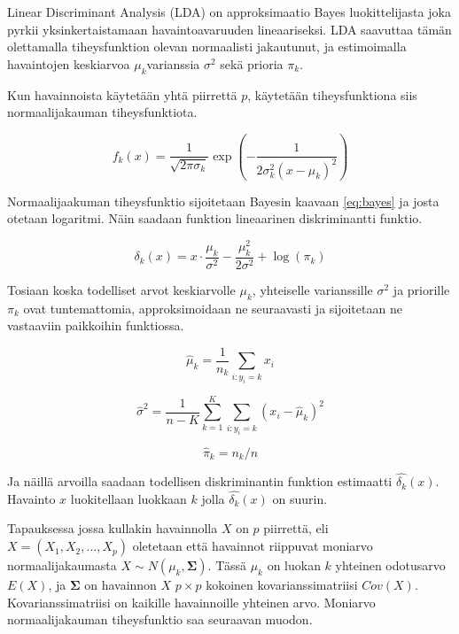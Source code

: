 \documentclass[finnish,twoside,openright]{HYgraduMLDS}
\begin{document}
Linear Discriminant Analysis (LDA) on approksimaatio Bayes luokittelijasta joka pyrkii yksinkertaistamaan havaintoavaruuden lineaariseksi. LDA saavuttaa tämän olettamalla tiheysfunktion olevan normaalisti jakautunut, ja estimoimalla havaintojen keskiarvoa $\mu_k$varianssia $\sigma^2$ sekä prioria $\pi_k$.

Kun havainnoista käytetään yhtä piirrettä $p$, käytetään tiheysfunktiona siis normaalijakauman tiheysfunktiota.

\begin{equation}
    f_k(x) = \frac{1}{\sqrt{2 \pi \sigma_k}} \exp{(-\frac{1}{2 \sigma^2_k (x - \mu_k)^2})}
\end{equation}

Normaalijaakuman tiheysfunktio sijoitetaan Bayesin kaavaan \ref{eq:bayes} ja josta otetaan logaritmi. Näin saadaan funktion lineaarinen diskriminantti funktio.

\begin{equation}
    \delta_k(x) = x \cdot \frac{\mu_k}{\sigma^2} - \frac{\mu^2_k}{2 \sigma^2} + \log(\pi_k)
\end{equation}

Tosiaan koska todelliset arvot keskiarvolle $\mu_k$, yhteiselle varianssille $\sigma^2$ ja priorille $\pi_k$ ovat tuntemattomia, approksimoidaan ne seuraavasti ja sijoitetaan ne vastaaviin paikkoihin funktiossa.

\begin{equation} \label{eq:estimate-mu}
    \hat{\mu}_k = \frac{1}{n_k} \sum_{i:y_i = k} x_i
\end{equation}

\begin{equation}
    \hat{\sigma}^2 = \frac{1}{n - K} \sum^K_{k=1} \sum_{i:y_i = k} (x_i - \hat{\mu}_k)^2
\end{equation}

\begin{equation} \label{eq:estimate-pi}
    \hat{\pi}_k = n_k / n
\end{equation}

Ja näillä arvoilla saadaan todellisen diskriminantin funktion estimaatti $\hat{\delta_k}(x)$. Havainto $x$ luokitellaan luokkaan $k$ jolla $\hat{\delta_k}(x)$ on suurin.

Tapauksessa jossa kullakin havainnolla $X$ on $p$ piirrettä, eli $X = (X_1, X_2, \dots, X_p)$ oletetaan että havainnot riippuvat moniarvo normaalijakaumasta $X \sim N(\mu_k, \pmb{\Sigma})$. Tässä $\mu_k$ on luokan $k$ yhteinen odotusarvo $E(X)$, ja $\pmb{\Sigma}$ on havainnon $X$ $p \times p$ kokoinen kovarianssimatriisi $Cov(X)$. Kovarianssimatriisi on kaikille havainnoille yhteinen arvo. Moniarvo normaalijakauman tiheysfunktio saa seuraavan muodon.
\end{document}
